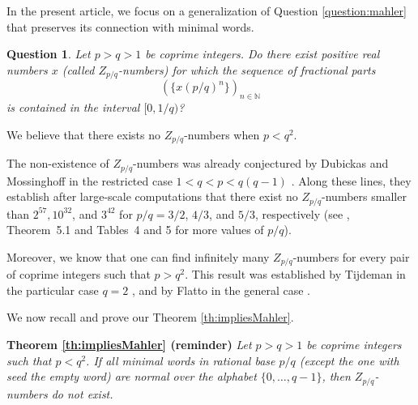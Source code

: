 \documentclass{template_arxiv}
\newtheorem{question}[theorem]{Question}
\numberwithin{equation}{section}
\newcommand{\N}{\mathbb N}
\begin{document}
\medskip

In the present article, we focus on a generalization of Question \ref{question:mahler}
that preserves its connection with minimal words.


\begin{question}\label{question:mahler_generalized} Let $p>q>1$ be coprime integers. Do there exist positive real numbers $x$ (called \emph{$Z_{p/q}$-numbers}) for which the sequence of fractional parts
	\[(\{x(p/q)^n\})_{n\in \N}\]
	is contained in the interval $[0,1/q)$?
\end{question}

We believe that there exists no $Z_{p/q}$-numbers when $p<q^2$.
\medskip

The non-existence of $Z_{p/q}$-numbers was already conjectured by Dubickas and Mossinghoff in the restricted case $1<q<p<q(q-1)$ \cite[Proposition~3.1]{DM09}. Along these lines, they establish after large-scale computations that there exist no $Z_{p/q}$-numbers smaller than $2^{57}, 10^{32}$, and $3^{42}$ for $p/q= 3/2$, $4/3$, and $5/3$, respectively (see \cite{DM09}, Theorem~5.1 and Tables~4 and 5 for more values of $p/q$).

\medskip

Moreover, we know that one can find infinitely many $Z_{p/q}$-numbers for every pair of coprime integers such that $p>q^2$. This result was established by Tijdeman in the particular case $q=2$ \cite[item (ii) p2]{Tij72}, and by Flatto in the general case \cite[Theorem 7.3, with $t=1/q$]{Fla92}. 


\medskip

We now recall and prove our Theorem \ref{th:impliesMahler}.

\medskip

\noindent \textbf{Theorem \ref{th:impliesMahler} (reminder)}  
\emph{Let $p>q>1$ be coprime integers such that $p<q^2$. If all minimal words in rational base $p/q$ (except the one with seed the empty word) are normal over the alphabet $\{0,\dots,q-1\}$, then $Z_{p/q}$-numbers do not exist. } 
\end{document}
